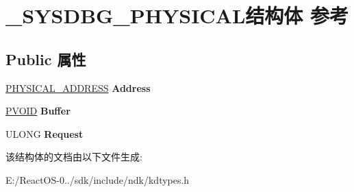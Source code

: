 \hypertarget{struct___s_y_s_d_b_g___p_h_y_s_i_c_a_l}{}\section{\+\_\+\+S\+Y\+S\+D\+B\+G\+\_\+\+P\+H\+Y\+S\+I\+C\+A\+L结构体 参考}
\label{struct___s_y_s_d_b_g___p_h_y_s_i_c_a_l}
\subsection*{Public 属性}
\begin{DoxyCompactItemize}
\item 
\mbox{\label{struct___s_y_s_d_b_g___p_h_y_s_i_c_a_l_af20a3986308c8f7bd175fa4a87b9381f}} 
\hyperlink{union___l_a_r_g_e___i_n_t_e_g_e_r}{P\+H\+Y\+S\+I\+C\+A\+L\+\_\+\+A\+D\+D\+R\+E\+SS} {\bfseries Address}
\item 
\mbox{\label{struct___s_y_s_d_b_g___p_h_y_s_i_c_a_l_a1132ee93a7222b178dff2c06160c1cdd}} 
\hyperlink{interfacevoid}{P\+V\+O\+ID} {\bfseries Buffer}
\item 
\mbox{\label{struct___s_y_s_d_b_g___p_h_y_s_i_c_a_l_a441e437b33a431c47260ea710e2700ab}} 
U\+L\+O\+NG {\bfseries Request}
\end{DoxyCompactItemize}


该结构体的文档由以下文件生成\+:\begin{DoxyCompactItemize}
\item 
E\+:/\+React\+O\+S-\/0../sdk/include/ndk/kdtypes.\+h\end{DoxyCompactItemize}
